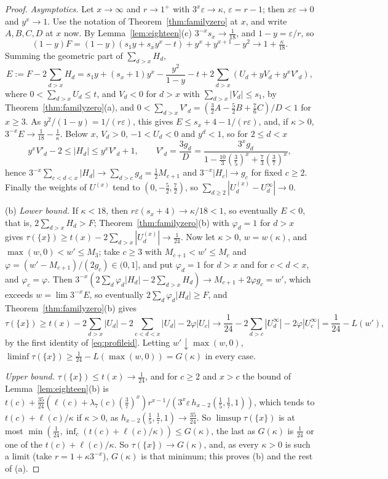 \documentclass[11pt]{article}
\begin{document}
\begin{proof}
\emph{Asymptotics.}  Let $x\to\infty$ and $r\to1^+$ with
$3^x\varepsilon\to\kappa$, $\varepsilon=r-1$; then $x\varepsilon\to0$ and
$y^x\to1$.  Use the notation of Theorem~\ref{thm:familyzero} at $x$, and
write $A,B,C,D$ at $x$ now.  By Lemma~\ref{lem:eighteen}(c)
$3^{-x}s_x\to\tfrac1{18}$, and $1-y=\varepsilon/r$, so
\begin{equation}\label{eq:Fscale}
  (1-y)F=(1-y)(s_1y+s_xy^x-t)+y^x+y^{x+1}-y^2\to1+\tfrac\kappa{18}.
\end{equation}
Summing the geometric part of $\sum_{d>x}H_d$,
\[
  E:=F-2\sum_{d>x}H_d
  =s_1y+(s_x+1)y^x-\frac{y^2}{1-y}-t+2\sum_{d>x}(U_d+yV_d+y^xV'_d),
\]
where $0<\sum_{d>x}U_d\le t$, and $V_d<0$ for $d>x$ with
$\sum_{d>x}|V_d|\le s_1$, by Theorem~\ref{thm:familyzero}(a), and
$0<\sum_{d>x}V'_d=(\tfrac32A-\tfrac52B+\tfrac76C)/D<1$ for $x\ge3$.  As
$y^2/(1-y)=1/(r\varepsilon)$, this gives $E\le s_x+4-1/(r\varepsilon)$, and,
if $\kappa>0$, $3^{-x}E\to\tfrac1{18}-\tfrac1\kappa$.  Below $x$, $V_d>0$,
$-1<U_d<0$ and $y^d<1$, so for $2\le d<x$
\begin{equation}\label{eq:Hbelow}
  y^xV'_d-2\le|H_d|\le y^xV'_d+1,\qquad
  V'_d=\frac{3g_d}D=\frac{3^xg_d}{1-\tfrac{10}3(\tfrac35)^x+\tfrac73(\tfrac37)^x},
\end{equation}
hence $3^{-x}\sum_{c<d<x}|H_d|\to\sum_{d>c}g_d=\tfrac12M_{c+1}$ and
$3^{-x}|H_c|\to g_c$ for fixed $c\ge2$.  Finally the weights of $U^{(x)}$
tend to $(0,-\tfrac52,\tfrac72)$, so $\sum_{d\ge2}|U^{(x)}_d-U^\infty_d|\to0$.

(b) \emph{Lower bound.}  If $\kappa<18$, then
$r\varepsilon(s_x+4)\to\kappa/18<1$, so eventually $E<0$, that is,
$2\sum_{d>x}H_d>F$; Theorem~\ref{thm:familyzero}(b) with $\varphi_d=1$ for
$d>x$ gives $\tau(\{x\})\ge t(x)-2\sum_{d>x}|U^{(x)}_d|\to\tfrac1{24}$.  Now
let $\kappa>0$, $w=w(\kappa)$, and $\max(w,0)<w'\le M_3$; take $c\ge3$ with
$M_{c+1}<w'\le M_c$ and $\varphi=(w'-M_{c+1})/(2g_c)\in(0,1]$, and put
$\varphi_d=1$ for $d>x$ and for $c<d<x$, and $\varphi_c=\varphi$.  Then
$3^{-x}(2\sum_d\varphi_d|H_d|-2\sum_{d>x}H_d)\to M_{c+1}+2\varphi g_c=w'$,
which exceeds $w=\lim3^{-x}E$, so eventually $2\sum_d\varphi_d|H_d|\ge F$,
and Theorem~\ref{thm:familyzero}(b) gives
\[
  \tau(\{x\})\ge t(x)-2\sum_{d>x}|U_d|-2\sum_{c<d<x}|U_d|-2\varphi|U_c|
  \to\frac1{24}-2\sum_{d>c}|U^\infty_d|-2\varphi|U^\infty_c|=\frac1{24}-L(w'),
\]
by the first identity of \eqref{eq:profileid}.  Letting $w'\downarrow\max(w,0)$,
$\liminf\tau(\{x\})\ge\tfrac1{24}-L(\max(w,0))=G(\kappa)$ in every case.

\emph{Upper bound.}  $\tau(\{x\})\le t(x)\to\tfrac1{24}$, and for $c\ge2$
and $x>c$ the bound of Lemma~\ref{lem:eighteen}(b) is
$t(c)+\tfrac{35}{24}(\ell(c)+\lambda_7(c)(\tfrac37)^x)r^{x-1}/(3^x\varepsilon\,h_{x-2}(\tfrac15,\tfrac17,1))$,
which tends to $t(c)+\ell(c)/\kappa$ if $\kappa>0$, as
$h_{x-2}(\tfrac15,\tfrac17,1)\to\tfrac{35}{24}$.  So $\limsup\tau(\{x\})$ is at
most $\min(\tfrac1{24},\inf_c(t(c)+\ell(c)/\kappa))\le G(\kappa)$, the last as
$G(\kappa)$ is $\tfrac1{24}$ or one of the $t(c)+\ell(c)/\kappa$.  So
$\tau(\{x\})\to G(\kappa)$, and, as every $\kappa>0$ is such a limit (take
$r=1+\kappa3^{-x}$), $G(\kappa)$ is that minimum; this proves (b) and the
rest of (a).


\end{proof}
\end{document}
